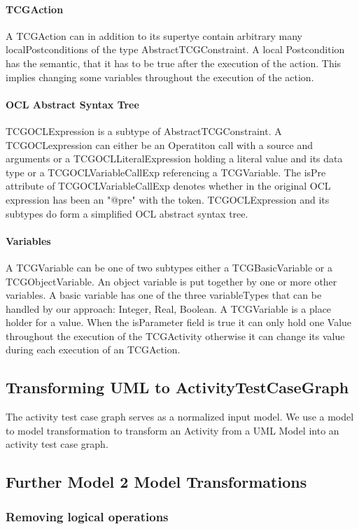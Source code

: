\paragraph{TCGAction} A TCGAction can in addition to its supertye contain arbitrary many localPostconditions of the type AbstractTCGConstraint. A local Postcondition has the semantic, that it has to be true after the execution of the action. This implies changing some variables throughout the execution of the action.
\paragraph{OCL Abstract Syntax Tree}
TCGOCLExpression is a subtype of AbstractTCGConstraint. A TCGOCLexpression can either be an Operatiton call with a source and  arguments or a TCGOCLLiteralExpression holding a literal value and its data type or a TCGOCLVariableCallExp referencing a TCGVariable. The isPre attribute of TCGOCLVariableCallExp denotes whether in the original OCL expression has been an "@pre" with the token. TCGOCLExpression and its subtypes do form a simplified OCL abstract syntax tree.
\paragraph{Variables}
A TCGVariable can be one of two subtypes either a TCGBasicVariable or a TCGObjectVariable. An object variable is put together by one or more other variables. A basic variable has one of the three variableTypes that can be handled by our approach: Integer, Real, Boolean. A TCGVariable is a place holder for a value. When the isParameter field is true it can only hold one Value throughout the execution of the TCGActivity otherwise it can change its value during each execution of an TCGAction.

\subsection{Transforming UML to ActivityTestCaseGraph}
The activity test case graph serves as a normalized input model. We use a model to model transformation to transform an Activity from a UML Model into an activity test case graph. 

\subsection{Further Model 2 Model Transformations}
\subsubsection{Removing logical operations}
